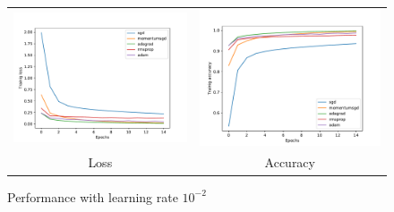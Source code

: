 \documentclass[12pt]{article}
\newcommand{\nnperfw}{7cm}
\begin{document}
\begin{figure}
\centering
\begin{tabular}{cc}
  \includegraphics[width=\nnperfw]{hw2/codes/optimizer/pytorch/results/1e-2/loss.pdf} &   \includegraphics[width=\nnperfw]{hw2/codes/optimizer/pytorch/results/1e-2/accuracy.pdf} \\
Loss & Accuracy \\[6pt]
\end{tabular}
\caption{Performance with learning rate $10^{-2}$} \label{fig:nn-1e-2}
\end{figure}
\end{document}
